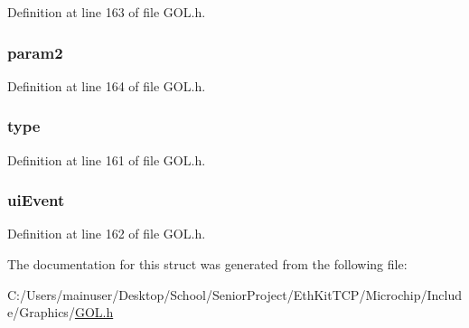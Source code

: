 Definition at line 163 of file G\+O\+L.\+h.

\hypertarget{struct_g_o_l___m_s_g_aae81f2ac2c75c0670e840e58cb7d206f}{}
\subsubsection[{param2}]{ param2}\label{struct_g_o_l___m_s_g_aae81f2ac2c75c0670e840e58cb7d206f}


Definition at line 164 of file G\+O\+L.\+h.

\hypertarget{struct_g_o_l___m_s_g_aab7cf12125f16245546ef7411994ebb9}{}
\subsubsection[{type}]{ type}\label{struct_g_o_l___m_s_g_aab7cf12125f16245546ef7411994ebb9}


Definition at line 161 of file G\+O\+L.\+h.

\hypertarget{struct_g_o_l___m_s_g_a8e419945a76e0e2df9dcb35982fec6b1}{}
\subsubsection[{ui\+Event}]{ ui\+Event}\label{struct_g_o_l___m_s_g_a8e419945a76e0e2df9dcb35982fec6b1}


Definition at line 162 of file G\+O\+L.\+h.



The documentation for this struct was generated from the following file\+:\begin{DoxyCompactItemize}
\item 
C\+:/\+Users/mainuser/\+Desktop/\+School/\+Senior\+Project/\+Eth\+Kit\+T\+C\+P/\+Microchip/\+Include/\+Graphics/\hyperlink{_g_o_l_8h}{G\+O\+L.\+h}\end{DoxyCompactItemize}
